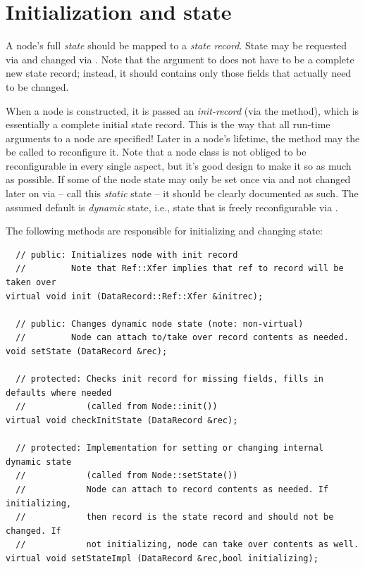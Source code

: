 \documentclass[10pt,twoside]{book}
\begin{document}
\section{Initialization and state}
  
  A node's full {\em state} should be mapped to a {\em state record}. State may
  be requested via  and changed via . Note that
  the argument to  does not have to be a complete new state
  record; instead, it should contains only those fields that actually need to
  be changed. 

  When a node is constructed, it is passed an {\em init-record} (via the
   method), which is essentially a complete initial state record.
  This is the way that all run-time arguments to a node are specified! Later 
  in a node's lifetime, the  method may the be called to
  reconfigure  it. Note that a node class is not obliged to be reconfigurable
  in every single aspect, but it's good design to make it so as much as
  possible. If some of the node state may only be set once via  and
  not changed later on via  -- call this {\em static\/} state --
  it should be clearly documented as such. The assumed default is {\em
  dynamic\/} state, i.e., state that is freely reconfigurable via
  .

  The following methods are responsible for initializing and changing state:

\begin{verbatim}
  // public: Initializes node with init record
  //         Note that Ref::Xfer implies that ref to record will be taken over
virtual void init (DataRecord::Ref::Xfer &initrec);

  // public: Changes dynamic node state (note: non-virtual)
  //         Node can attach to/take over record contents as needed.
void setState (DataRecord &rec);

  // protected: Checks init record for missing fields, fills in defaults where needed
  //            (called from Node::init())
virtual void checkInitState (DataRecord &rec);

  // protected: Implementation for setting or changing internal dynamic state 
  //            (called from Node::setState())
  //            Node can attach to record contents as needed. If initializing,
  //            then record is the state record and should not be changed. If
  //            not initializing, node can take over contents as well.
virtual void setStateImpl (DataRecord &rec,bool initializing);
\end{verbatim}
\end{document}
